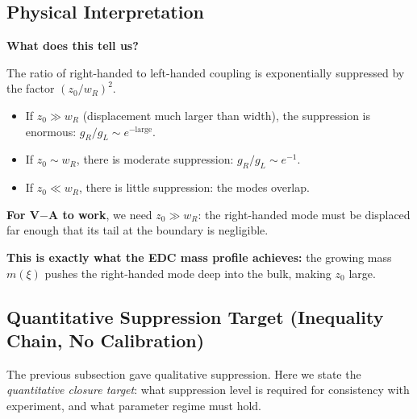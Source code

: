 \subsection{Physical Interpretation}

\textbf{What does this tell us?}

The ratio of right-handed to left-handed coupling is exponentially suppressed
by the factor $(z_0/w_R)^2$.

\begin{itemize}[nosep]
    \item If $z_0 \gg w_R$ (displacement much larger than width), the suppression
          is enormous: $g_R/g_L \sim e^{-\text{large}}$.
    \item If $z_0 \sim w_R$, there is moderate suppression: $g_R/g_L \sim e^{-1}$.
    \item If $z_0 \ll w_R$, there is little suppression: the modes overlap.
\end{itemize}

\textbf{For V$-$A to work}, we need $z_0 \gg w_R$: the right-handed mode must
be displaced far enough that its tail at the boundary is negligible.

\textbf{This is exactly what the EDC mass profile achieves:} the growing mass
$m(\xi)$ pushes the right-handed mode deep into the bulk, making $z_0$ large.

\subsection{Quantitative Suppression Target (Inequality Chain, No Calibration)}
\label{subsec:va_inequality_chain}

The previous subsection gave qualitative suppression. Here we state the
\emph{quantitative closure target}: what suppression level is required for
consistency with experiment, and what parameter regime must hold.

